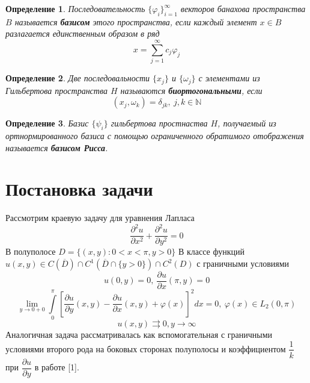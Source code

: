 \documentclass[a4paper, 11pt]{article}
\newtheorem{definition}{Определение}
\begin{document}
\begin{definition}
	Последовательность $\{\varphi_i\}_{i=1}^{\infty}$ векторов банахова пространства $B$ называется \textbf{базисом} этого пространства, если каждый элемент $x \in B$ разлагается единственным образом в ряд $$
	x = \sum\limits_{j=1}^{\infty} c_j \varphi_j
	$$
\end{definition}
\begin{definition}
	Две последовальности $\{x_j\}$ и $\{\omega_j\}$ с элементами из Гильбертова пространства $H$ называются \textbf{биортогональными}, если $$
	(x_j, \omega_k) = \delta_{jk}, \ j, k \in \mathbb{N}
	$$
\end{definition}
\begin{definition}
	Базис $\{\psi_i\}$ гильбертова простнаства $H$, получаемый из ортнормированного базиса с помощью ограниченного обратимого отображения  называется \textbf{базисом Рисса}.
\end{definition}

\section{Постановка задачи}

Рассмотрим краевую задачу для уравнения Лапласа
\begin{equation}
	\dfrac{\partial^2 u}{\partial x^2} +\dfrac{\partial^2 u}{\partial y^2} = 0
\end{equation}
В полуполосе $D = \{(x,y): 0 < x < \pi, y > 0\}$\newline
В классе функций $u(x,y) \in C(\overline{D}) \cap C^1(\overline{D} \cap \{y > 0\}) \cap C^2 (D)$ \newline
с граничными условиями
\begin{equation}
	u(0, y) = 0, \ \dfrac{\partial u}{\partial x} (\pi, y) = 0
\end{equation}
\begin{equation}
	\lim\limits_{y \to 0 + 0} \int\limits_0^\pi \left[\dfrac{\partial u}{\partial y}(x,y) - \dfrac{\partial u}{\partial x} (x,y) + \varphi(x) \right]^2 dx = 0, \ \varphi(x) \in L_2(0,\pi)
\end{equation}
\begin{equation}
	u(x,y) \rightrightarrows 0, y \to \infty
\end{equation}
Аналогичная задача рассматривалась как вспомогательная с граничными условиями второго рода на боковых сторонах полуполосы и коэффициентом $\dfrac{1}{k}$ при $\dfrac{\partial u}{\partial y}$ в работе [1].
\end{document}
